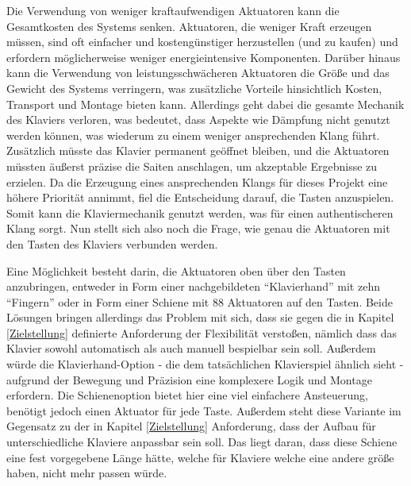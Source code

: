 Die Verwendung von weniger kraftaufwendigen Aktuatoren kann die Gesamtkosten des Systems senken. Aktuatoren, die weniger
Kraft erzeugen müssen, sind oft einfacher und kostengünstiger herzustellen (und zu kaufen) und erfordern möglicherweise weniger
energieintensive Komponenten. Darüber hinaus kann die Verwendung von leistungsschwächeren
Aktuatoren die Größe und das Gewicht des Systems verringern, was zusätzliche Vorteile hinsichtlich Kosten, Transport und
Montage bieten kann. \newline
Allerdings geht dabei die gesamte Mechanik des Klaviers verloren, was bedeutet, dass Aspekte wie Dämpfung nicht genutzt werden können,
was wiederum zu einem weniger ansprechenden Klang führt. Zusätzlich müsste das Klavier permanent geöffnet bleiben, und die
Aktuatoren müssten äußerst präzise die Saiten anschlagen, um akzeptable Ergebnisse zu erzielen.
Da die Erzeugung eines ansprechenden Klangs für dieses Projekt eine höhere Priorität annimmt, fiel die Entscheidung
darauf, die Tasten anzuspielen. Somit kann die Klaviermechanik genutzt werden, was für einen
authentischeren Klang sorgt. \newline
Nun stellt sich also noch die Frage, wie genau die Aktuatoren mit den Tasten des Klaviers verbunden werden.

Eine Möglichkeit besteht darin, die Aktuatoren oben über den Tasten anzubringen, entweder in Form einer nachgebildeten
\enquote{Klavierhand} mit zehn \enquote{Fingern} oder in Form einer Schiene mit 88 Aktuatoren auf den Tasten.
Beide Lösungen bringen allerdings das Problem mit sich, dass sie gegen die in Kapitel \ref{Zielstellung} definierte Anforderung
der Flexibilität verstoßen, nämlich dass das Klavier sowohl automatisch als auch manuell bespielbar sein soll.\newline
Außerdem würde die Klavierhand-Option - die dem tatsächlichen Klavierspiel ähnlich sieht -
aufgrund der Bewegung und Präzision eine komplexere Logik und
Montage erfordern. Die Schienenoption bietet hier eine viel einfachere Ansteuerung, benötigt jedoch einen Aktuator für jede Taste.
Außerdem steht diese Variante im Gegensatz zu der in Kapitel \ref{Zielstellung} Anforderung, dass der Aufbau für unterschiedliche Klaviere anpassbar
sein soll. Das liegt daran, dass diese Schiene eine fest vorgegebene Länge hätte, welche für Klaviere welche eine
andere größe haben, nicht mehr passen würde. \newline

